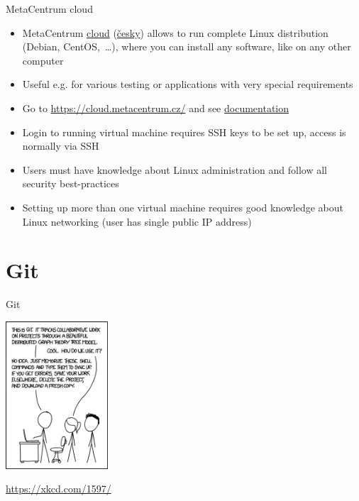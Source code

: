 \documentclass[compress, ucs, xelatex, 11pt, xcolor=svgnames, aspectratio=169,
	hyperref={
		bookmarks=true,
		unicode=true,
		colorlinks=true,
		pdftitle={Linux, command line and MetaCentrum},
		plainpages=false,
		pdfauthor={Vojtech Zeisek},
		pdfsubject={Course about use of Linux command line, writing shell scripts and using MetaCentrum of CESNET},
		pdfcreator={XeLaTeX},
		pdfkeywords={Linux, GNU, BASH, shell, command line, MetaCentrum},
		linkcolor=DarkRed, %
		anchorcolor=DarkBlue, %
		citecolor=Indigo, %
		filecolor=NavyBlue, %
		menucolor=DarkMagenta, %
		urlcolor=DarkBlue, %
		pdftex},
	url={hyphens, lowtilde} %
	]{beamer}
\begin{document}
\begin{frame}{MetaCentrum cloud}
	\begin{itemize}
		\item MetaCentrum \href{https://wiki.metacentrum.cz/wiki/Kategorie:Clouds}{cloud} (\href{https://wiki.metacentrum.cz/wiki/Kategorie:Cloudy}{česky}) allows to run complete Linux distribution (Debian, CentOS,~\ldots), where you can install any software, like on any other computer
		\item Useful e.g. for various testing or applications with very special requirements
		\item Go to \url{https://cloud.metacentrum.cz/} and see \href{https://docs.cloud.muni.cz/}{documentation}
		\item Login to running virtual machine requires SSH keys to be set up, access is normally via SSH
		\item Users must have knowledge about Linux administration and follow all security best-practices
		\item Setting up more than one virtual machine requires good knowledge about Linux networking (user has single public IP address)
	\end{itemize}
\end{frame}

\section{Git}

\begin{frame}{Git}
	\begin{multicols}{2}
		\vfill
		\tableofcontents[currentsection, sectionstyle=show/hide, hideothersubsections]
		\columnbreak
		\begin{center}
			\includegraphics[height=5.5cm]{git_xkcd.png}
		\end{center}
		\begin{flushright}
			\url{https://xkcd.com/1597/}
		\end{flushright}
	\end{multicols}
\end{frame}
\end{document}
